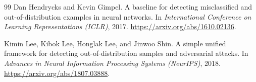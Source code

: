 \documentclass[11pt]{article}
\begin{document}
\begin{thebibliography}{99}
Dan Hendrycks and Kevin Gimpel.
\newblock A baseline for detecting misclassified and out-of-distribution examples in neural networks.
\newblock In \emph{International Conference on Learning Representations (ICLR)}, 2017.
\newblock \url{https://arxiv.org/abs/1610.02136}.

Kimin Lee, Kibok Lee, Honglak Lee, and Jinwoo Shin.
\newblock A simple unified framework for detecting out-of-distribution samples and adversarial attacks.
\newblock In \emph{Advances in Neural Information Processing Systems (NeurIPS)}, 2018.
\newblock \url{https://arxiv.org/abs/1807.03888}.

\end{thebibliography}
\end{document}
